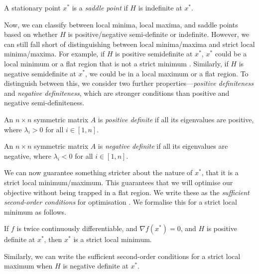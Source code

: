 \begin{definition}
    A stationary point $x^*$ is a \textit{saddle point} if $H$ is indefinite at $x^*$.
\end{definition}

Now, we can classify between local minima, local maxima, and saddle points based on whether $H$ is positive/negative semi-definite or indefinite. However, we can still fall short of distinguishing between local minima/maxima and strict local minima/maxima. For example, if $H$ is positive semidefinite at $x^*$, $x^*$ could be a local minimum or a flat region that is not a strict minimum \citep{NoceWrig06}. Similarly, if $H$ is negative semidefinite at $x^*$, we could be in a local maximum or a flat region. To distinguish between this, we consider two further properties---\textit{positive definiteness} and \textit{negative definiteness}, which are stronger conditions than positive and negative semi-definiteness.

\begin{definition}
    An $n \times n$ symmetric matrix $A$ is \textit{positive definite} if all its eigenvalues are positive, where $\lambda_i > 0$ for all $i \in [1, n]$.
\end{definition}
\begin{definition}
    An $n \times n$ symmetric matrix $A$ is \textit{negative definite} if all its eigenvalues are negative, where $\lambda_i < 0$ for all $i \in [1, n]$.
\end{definition}

We can now guarantee something stricter about the nature of $x^*$, that it is a strict local minimum/maximum. This guarantees that we will optimise our objective without being trapped in a flat region. We write these as the \textit{sufficient second-order conditions} for optimisation \citep{NoceWrig06}. We formalise this for a strict local minimum as follows.
\begin{definition}
    If $f$ is twice continuously differentiable, and $\nabla f(x^*) = 0$, and $H$ is positive definite at $x^*$, then $x^*$ is a strict local minimum.
    \label{definition:second_order_sufficient}
\end{definition}
Similarly, we can write the sufficient second-order conditions for a strict local maximum when $H$ is negative definite at $x^*$.

